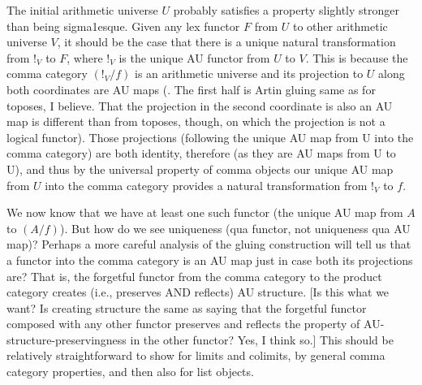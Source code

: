 \begin{TODOblock}
The initial arithmetic universe $U$ probably satisfies a property slightly stronger than being sigma1esque. Given any lex functor $F$ from $U$ to other arithmetic universe $V$, it should be the case that there is a unique natural transformation from $!_V$ to $F$, where $!_V$ is the unique AU functor from $U$ to $V$. This is because the comma category $(!_V / f)$ is an arithmetic universe and its projection to $U$ along both coordinates are AU maps (\TODO. The first half is Artin gluing same as for toposes, I believe. That the projection in the second coordinate is also an AU map is different than from toposes, though, on which the projection is not a logical functor). Those projections (following the unique AU map from U into the comma category) are both identity, therefore (as they are AU maps from U to U), and thus by the universal property of comma objects our unique AU map from $U$ into the comma category provides a natural transformation from $!_V$ to $f$.

We now know that we have at least one such functor (the unique AU map from $A$ to $(A/f)$). But how do we see uniqueness (qua functor, not uniqueness qua AU map)? Perhaps a more careful analysis of the gluing construction will tell us that a functor into the comma category is an AU map just in case both its projections are? That is, the forgetful functor from the comma category to the product category creates (i.e., preserves AND reflects) AU structure. [Is this what we want? Is creating structure the same as saying that the forgetful functor composed with any other functor preserves and reflects the property of AU-structure-preservingness in the other functor? Yes, I think so.] This should be relatively straightforward to show for limits and colimits, by general comma category properties, and then also for list objects. \TODO
\end{TODOblock}

